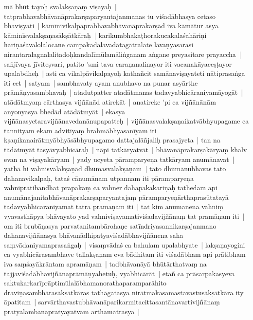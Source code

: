 \documentclass[article,12pt,a4paper]{memoir}%
\newcounter{parCount}
\begin{document}
	  \pstart \leavevmode%
	\label{thakur75-10.28}mā bhūt tayoḥ svalakṣaṇaṃ viṣayaḥ | tatprabhavabhāvanāprakarṣaparyantajanmanas tu viśadābhasya cetaso bhaviṣyati | kāmīnīvikalpaprabhavabhāvanāprakarṣād iva kāmātur asya kāminīsvalakṣaṇasākṣātkāraḥ | karikumbhakaṭhorakucakalaśahāriṇi hariṇaśāvalolalocane campakadalāvadātagātralate lāvaṇyasarasi nirantaralagnalalitadoḥkandalīmūlamāliṅganam aṅgane preyasitare prayaccha | sañjīvaya jīviteṣvari, patito 'smi tava caraṇanalinayor iti vacanakāyaceṣṭayor upalabdheḥ | asti ca vikalpāvikalpayoḥ kathañcit samānaviṣayateti nātiprasaṅga iti cet | satyam | sambhavaty ayam anubhavo na punar asyārthe prāmāṇyasambhavaḥ | atadutpatter atadātmanas tadavyabhicāraniyamāyogāt | atādātmyaṃ cārthasya vijñānād atirekāt | anatireke 'pi ca vijñānānām anyonyasya bhedād atādātmyāt | ekasya vijñānasyetaravijñānavedanānupapatteḥ | vijñānasvalakṣaṇaikatvābhyupagame ca tannityam ekam advitīyaṃ brahmābhyasanīyam iti kṣaṇikanairātmyābhyāsābhyupagamo dattajalāñjaliḥ prasajyeta | tan na tādātmyāt tasyāvyabhicāraḥ | nāpi tatkāryatvāt | bhāvanāprakarṣakāryaṃ khalv evan na viṣayakāryam | yady ucyeta pāramparyeṇa tatkāryam anumānavat | yathā hi vahnisvalakṣaṇād dhūmasvalakṣaṇam | tato dhūmānubhavas tato dahanavikalpaḥ, tataś cānumānam utpannam iti pāramparyeṇa vahnipratibandhāt prāpakaṃ ca vahner dāhapākakāriṇaḥ tathedam api anumānajanitabhāvanāprakarṣaparyantajaṃ pāramparyeṇārthaprasūtatayā tadavyabhicāraniyamāt tatra pramāṇam iti | tat kim anumānena vahniṃ vyavasthāpya bhāvayato yad vahniviṣayamativiśadavijñānaṃ tat pramāṇam iti | om iti brubāṇasya parvatanitambārohaṇe satīndriyasannikarṣajanmano dahanavijñānasya bhāvanādhipatyaviśadābhavijñānena saha saṃvādaniyamaprasaṅgaḥ | visaṃvādaś ca bahulam upalabhyate | lakṣaṇayogini ca vyabhicārasambhave tallakṣaṇam eva bādhitam iti viśadābham api prātibham iva saṃśayākrāntam apramāṇam | tadbhāvanāyā bhūtārthatvaṃ na tajjaviśadābhavijñānaprāmāṇyahetuḥ, vyabhicārāt | etañ ca prāsarpakasyeva saktukarkarīprāptimūlalābhamanorathaparamparāhito draviṇasambhārasākṣātkāras tathāgatasya nirātmakasamastavastusākṣātkāra ity āpatitam | sarvārthavastubhāvanāparikarmitacittasantānavartivijñānaṃ pratyālambanapratyayatvam arthamātrasya | 
	{}
	\pend%
      
\end{document}
